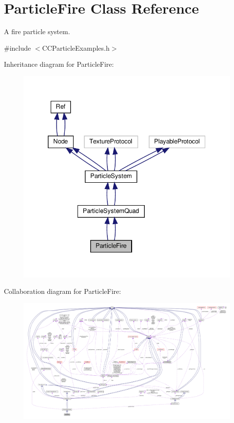 \hypertarget{classParticleFire}{}\section{Particle\+Fire Class Reference}
\label{classParticleFire}


A fire particle system.  




{\ttfamily \#include $<$C\+C\+Particle\+Examples.\+h$>$}



Inheritance diagram for Particle\+Fire\+:
\nopagebreak
\begin{figure}[H]
\begin{center}
\leavevmode
\includegraphics[width=332pt]{classParticleFire__inherit__graph}
\end{center}
\end{figure}


Collaboration diagram for Particle\+Fire\+:
\nopagebreak
\begin{figure}[H]
\begin{center}
\leavevmode
\includegraphics[width=350pt]{classParticleFire__coll__graph}
\end{center}
\end{figure}
